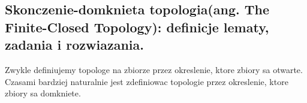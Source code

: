 \documentclass{article}
\begin{document}
\subsection{Skonczenie-domknieta topologia(ang. The Finite-Closed Topology): definicje lematy, zadania i rozwiazania.}

Zwykle definiujemy topologe na zbiorze przez okreslenie, ktore zbiory sa otwarte. Czasami bardziej naturalnie jest zdefiniowac topologie przez okreslenie, ktore zbiory sa domkniete.
\end{document}
